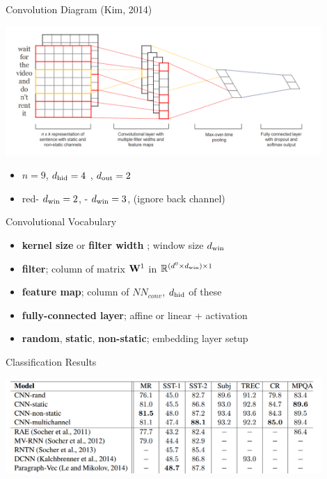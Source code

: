 \documentclass{beamer}
\begin{document}
\begin{frame}{Convolution Diagram (Kim, 2014)}
  \begin{center}
    \includegraphics[width=12cm]{kimdiagram}
  \end{center}
  \begin{itemize}
  \item $n = 9$, ${d_{\mathrm{hid}}}=4$ , ${d_{\mathrm{out}}}=2$  
    \air 
  \item \alert{red}- ${d_{\mathrm{win}}} =2$, - ${d_{\mathrm{win}}} =3$, (ignore back channel) 
    \air 

  \end{itemize}
\end{frame}


\begin{frame}{Convolutional Vocabulary}
  \begin{itemize}
  \item \textbf{kernel size} or \textbf{filter width} ; window size ${d_{\mathrm{win}}}$
    \air 
  \item \textbf{filter}; column of matrix  $\mathbf{W}^1$ in $\mathbb{R}^{(d^0\times {d_{\mathrm{win}}})  \times 1}$  
    \air 

  \item \textbf{feature map}; column of $NN_{conv}$, ${d_{\mathrm{hid}}}$ of these 
    \air 

  \item \textbf{fully-connected layer}; affine or linear  + activation  
    \air 

  \item \textbf{random}, \textbf{static}, \textbf{non-static}; embedding layer setup
  \end{itemize}
\end{frame}

\begin{frame}{Classification Results}

  \begin{center}
    \includegraphics[width=12cm]{kimres}
  \end{center}
\end{frame}
\end{document}
